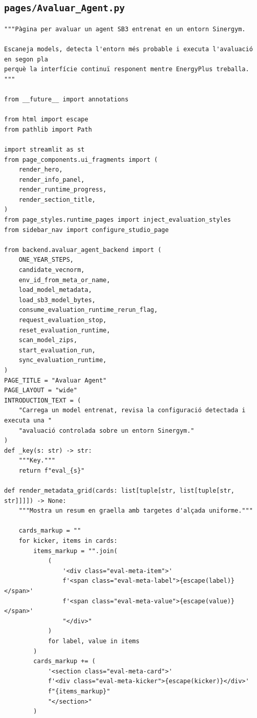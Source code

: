 \documentclass[10pt,a4paper]{article}
\begin{document}

\subsection{\texorpdfstring{\texttt{pages/Avaluar\_Agent.py}}{pages/Avaluar\_Agent.py}}

\begin{lstlisting}[style=studioPython,caption={pages/Avaluar\_Agent.py},label={lst:pages-avaluar-agent-py}]
"""Pàgina per avaluar un agent SB3 entrenat en un entorn Sinergym.

Escaneja models, detecta l'entorn més probable i executa l'avaluació en segon pla
perquè la interfície continuï responent mentre EnergyPlus treballa.
"""

from __future__ import annotations

from html import escape
from pathlib import Path

import streamlit as st
from page_components.ui_fragments import (
    render_hero,
    render_info_panel,
    render_runtime_progress,
    render_section_title,
)
from page_styles.runtime_pages import inject_evaluation_styles
from sidebar_nav import configure_studio_page

from backend.avaluar_agent_backend import (
    ONE_YEAR_STEPS,
    candidate_vecnorm,
    env_id_from_meta_or_name,
    load_model_metadata,
    load_sb3_model_bytes,
    consume_evaluation_runtime_rerun_flag,
    request_evaluation_stop,
    reset_evaluation_runtime,
    scan_model_zips,
    start_evaluation_run,
    sync_evaluation_runtime,
)
PAGE_TITLE = "Avaluar Agent"
PAGE_LAYOUT = "wide"
INTRODUCTION_TEXT = (
    "Carrega un model entrenat, revisa la configuració detectada i executa una "
    "avaluació controlada sobre un entorn Sinergym."
)
def _key(s: str) -> str:
    """Key."""
    return f"eval_{s}"

def render_metadata_grid(cards: list[tuple[str, list[tuple[str, str]]]]) -> None:
    """Mostra un resum en graella amb targetes d'alçada uniforme."""

    cards_markup = ""
    for kicker, items in cards:
        items_markup = "".join(
            (
                '<div class="eval-meta-item">'
                f'<span class="eval-meta-label">{escape(label)}</span>'
                f'<span class="eval-meta-value">{escape(value)}</span>'
                "</div>"
            )
            for label, value in items
        )
        cards_markup += (
            '<section class="eval-meta-card">'
            f'<div class="eval-meta-kicker">{escape(kicker)}</div>'
            f"{items_markup}"
            "</section>"
        )


\end{lstlisting}
\end{document}
